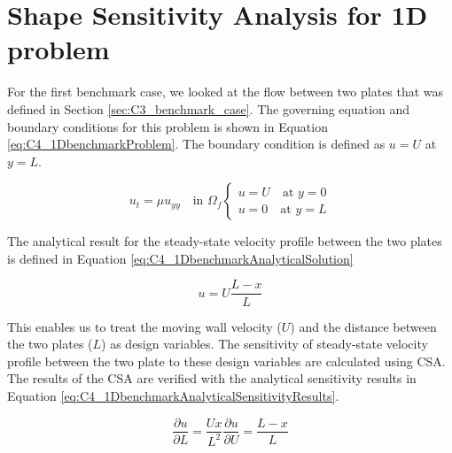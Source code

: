 \section{Shape Sensitivity Analysis for 1D problem}
For the first benchmark case, we looked at the flow between two plates that was defined in Section \ref{sec:C3_benchmark_case}. The governing equation and boundary conditions for this problem is shown in Equation \eqref{eq:C4_1DbenchmarkProblem}. The boundary condition is defined as $u = U$ at $y = L$.

\begin{subequations}\label{eq:C4_1DbenchmarkProblem}
\begin{equation}\label{eq:C4_1DbenchmarkGoverningEquation}
    u_t = \mu u_{yy} \quad \text{in } \Omega_f
\end{equation}
\begin{equation}\label{eq:C4_1DbenchmarkBoundaryCondition}
\begin{cases}
    u = U \quad \text{at } y = 0 \\
    u = 0 \quad \text{at } y = L
\end{cases}
\end{equation}
\end{subequations}

The analytical result for the steady-state velocity profile between the two plates is defined in Equation \eqref{eq:C4_1DbenchmarkAnalyticalSolution}

\begin{equation}\label{eq:C4_1DbenchmarkAnalyticalSolution}
    u = U\frac{L - x}{L}
\end{equation}

This enables us to treat the moving wall velocity ($U$) and the distance between the two plates ($L$) as design variables. The sensitivity of steady-state velocity profile between the two plate to these design variables are calculated using CSA. The results of the CSA are verified with the analytical sensitivity results in Equation \eqref{eq:C4_1DbenchmarkAnalyticalSensitivityResults}.

\begin{subequations}\label{eq:C4_1DbenchmarkAnalyticalSensitivityResults}
\begin{equation}\label{eq:C4_1DbenchmarkAnalyticalSAlength}
    \frac{\partial u}{\partial L} = \frac{Ux}{L^2}
\end{equation}
\begin{equation}\label{eq:C4_1DbenchmarkAnalyticalSAvelocity}
    \frac{\partial u}{\partial U} = \frac{L - x}{L}
\end{equation}
\end{subequations}

